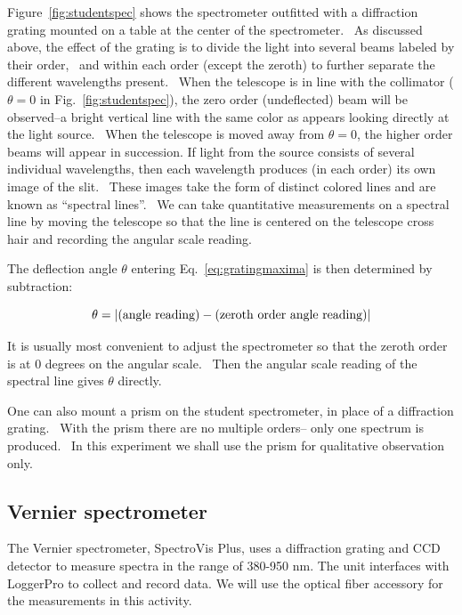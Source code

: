 Figure~\ref{fig:studentspec} shows the spectrometer outfitted with a diffraction grating
mounted on a table at the center of the spectrometer. \ As discussed
above, the effect of the grating is to divide the light into several
beams labeled by their order, \ and within each order (except the
zeroth) to further separate the different wavelengths present. \ When
the telescope is in line with the collimator ($\theta = 0$ in Fig.~\ref{fig:studentspec}),
the zero order (undeflected) beam will be observed--a bright vertical
line with the same color as appears looking directly at the light
source. \ When the telescope is moved away from $\theta=0$, the higher order
beams will appear in succession. If light from the source consists of
several individual wavelengths, then each wavelength produces (in each
order) its own image of the slit. \ These images take the form of
distinct colored lines and are known as ``spectral
lines''. \ We can take quantitative measurements on a
spectral line by moving the telescope so that the line is centered on
the telescope cross hair 
and recording the angular scale reading.

The deflection angle ${\theta}$ entering Eq.~\ref{eq:gratingmaxima} is then determined by
subtraction: 

\begin{equation}
\theta = \left| {\rm(angle\ reading)} - {\rm (zeroth\ order\ angle\ reading)} \right|
\label{eq:calib}
\end{equation}

It is usually most convenient to adjust the spectrometer so that the
zeroth order is at 0 degrees on the angular scale. \ Then the angular
scale reading of the spectral line gives ${\theta}$ directly.

One can also mount a prism on the student spectrometer, in place of a
diffraction grating. \ With the prism there are no multiple orders--
only one spectrum is produced. \ In this experiment we shall use the
prism for qualitative observation only. 

\subsection{Vernier spectrometer}

The Vernier spectrometer, SpectroVis Plus, uses a diffraction grating and CCD detector to measure spectra in the range of 380-950 nm.   The unit interfaces with LoggerPro to collect and record data. We will use the optical fiber accessory for the measurements in this activity.

